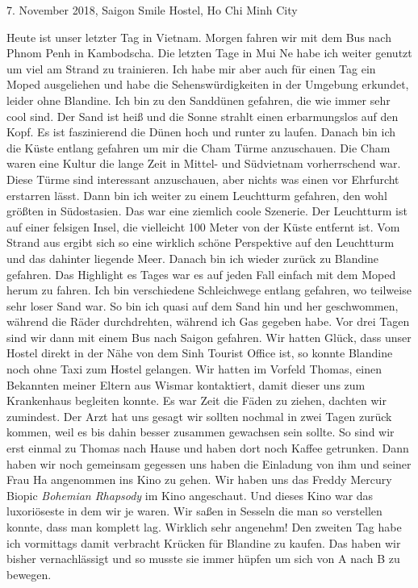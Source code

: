 \documentclass[11pt]{book}
\begin{document}
7. November 2018, Saigon Smile Hostel, Ho Chi Minh City

Heute ist unser letzter Tag in Vietnam. Morgen fahren wir mit dem Bus nach Phnom Penh in Kambodscha. Die letzten Tage in 
Mui Ne habe ich weiter genutzt um viel am Strand zu trainieren. Ich habe mir aber auch für einen Tag ein Moped ausgeliehen 
und habe die Sehenswürdigkeiten in der Umgebung erkundet, leider ohne Blandine. Ich bin zu den Sanddünen gefahren, die wie 
immer sehr cool sind. Der Sand ist heiß und die Sonne strahlt einen erbarmungslos auf den Kopf. Es ist faszinierend die Dünen 
hoch und runter zu laufen. Danach bin ich die Küste entlang gefahren um mir die Cham Türme anzuschauen. Die Cham waren eine 
Kultur die lange Zeit in Mittel- und Südvietnam vorherrschend war. Diese Türme sind interessant anzuschauen, aber nichts was 
einen vor Ehrfurcht erstarren lässt. Dann bin ich weiter zu einem Leuchtturm gefahren, den wohl größten in Südostasien. Das 
war eine ziemlich coole Szenerie. Der Leuchtturm ist auf einer felsigen Insel, die vielleicht 100 Meter von der Küste entfernt ist.
Vom Strand aus ergibt sich so eine wirklich schöne Perspektive auf den Leuchtturm und das dahinter liegende Meer. Danach bin 
ich wieder zurück zu Blandine gefahren. Das Highlight es Tages war es auf jeden Fall einfach mit dem Moped herum zu fahren. 
Ich bin verschiedene Schleichwege entlang gefahren, wo teilweise sehr loser Sand war. So bin ich quasi auf dem Sand hin und her 
geschwommen, während die Räder durchdrehten, während ich Gas gegeben habe. 
Vor drei Tagen sind wir dann mit einem Bus nach Saigon gefahren. Wir hatten Glück, dass unser Hostel direkt in der Nähe von 
dem Sinh Tourist Office ist, so konnte Blandine noch ohne Taxi zum Hostel gelangen. Wir hatten im Vorfeld Thomas, einen Bekannten 
meiner Eltern aus Wismar kontaktiert, damit dieser uns zum Krankenhaus begleiten konnte. Es war Zeit die Fäden zu ziehen, dachten 
wir zumindest. Der Arzt hat uns gesagt wir sollten nochmal in zwei Tagen zurück kommen, weil es bis dahin besser zusammen gewachsen 
sein sollte. So sind wir erst einmal zu Thomas nach Hause und haben dort noch Kaffee getrunken. Dann haben wir noch gemeinsam 
gegessen uns haben die Einladung von ihm und seiner Frau Ha angenommen ins Kino zu gehen. Wir haben uns das Freddy Mercury 
Biopic \emph{Bohemian Rhapsody} im Kino angeschaut. Und dieses Kino war das luxoriöseste in dem wir je waren. Wir saßen in Sesseln 
die man so verstellen konnte, dass man komplett lag. Wirklich sehr angenehm! Den zweiten Tag habe ich vormittags damit verbracht 
Krücken für Blandine zu kaufen. Das haben wir bisher vernachlässigt und so musste sie immer hüpfen um sich von A nach B zu bewegen. 
\end{document}
